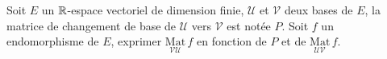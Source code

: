 Soit $E$ un $\mathbb{R}$-espace vectoriel de dimension finie, $\mathcal{U}$ et $\mathcal{V}$ deux bases de $E$, la matrice de changement de base de $\mathcal{U}$ vers $\mathcal{V}$ est notée $P$.
\newline Soit $f$ un endomorphisme de $E$, exprimer $\displaystyle{\underset{\mathcal{V U}}{\mathrm{Mat}}\, f}$ en fonction de $P$ et de  $\underset{\mathcal{U V}}{\mathrm{Mat}}\, f$.